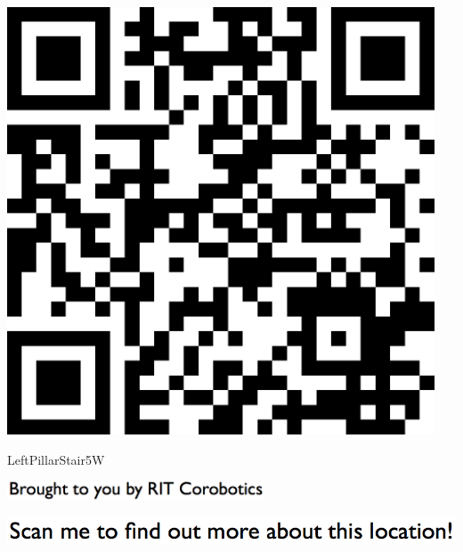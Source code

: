 \documentclass[letterpaper]{article}
\begin{document}
 \begingroup 
 \centerline{\includegraphics[scale=1,width=5in,height=5in]{LeftPillarStair5W.png}} 
 \endgroup 
 \vspace*{\fill} 

 \hfill{\small LeftPillarStair5W} 

  \vspace{0.7in} 
 
 \centerline{\includegraphics[scale=1,width=3in]{text-bottom.png}} 
 
 \pagebreak 
{} 
 \vspace*{\fill} 
 
  \centerline{\includegraphics[scale=1,width=6in]{text-top.png}} 
 
 \vspace{0.5in} 
 
\end{document}
